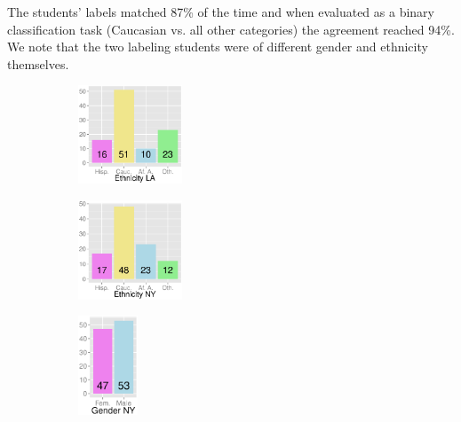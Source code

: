 The students' labels matched 87\% of the time and when evaluated as a binary classification task (Caucasian vs. all other categories) the agreement reached 94\%. 
We note that the two labeling students were of different gender and ethnicity themselves. 

\begin{figure}
	\centering
	\begin{subfigure}[t]{1.22in}
		\centering
		\includegraphics[width=1.22in]{fig/footprints/la_eth_bar.eps}
	\end{subfigure}
	\begin{subfigure}[t]{1.22in}
		\centering
		\includegraphics[width=1.22in]{fig/footprints/ny_eth_bar.eps}
	\end{subfigure}
	\begin{subfigure}[t]{0.7in}
		\centering
		\includegraphics[width=0.7in]{fig/footprints/ny_gender_bar.eps}
	\end{subfigure}
{\small
\begin{tabular}{| l | c | c | c |}

\end{tabular}}
\end{figure}
